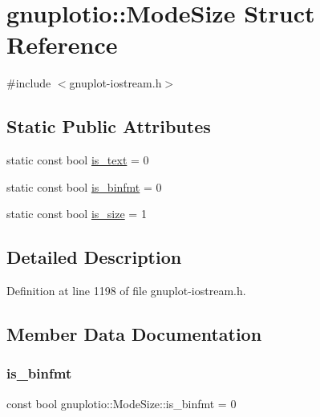 \hypertarget{structgnuplotio_1_1_mode_size}{}\section{gnuplotio\+:\+:Mode\+Size Struct Reference}
\label{structgnuplotio_1_1_mode_size}


{\ttfamily \#include $<$gnuplot-\/iostream.\+h$>$}

\subsection*{Static Public Attributes}
\begin{DoxyCompactItemize}
\item 
static const bool \hyperlink{structgnuplotio_1_1_mode_size_aa01840f76877ae7c8bad254dae28e32c}{is\+\_\+text} = 0
\item 
static const bool \hyperlink{structgnuplotio_1_1_mode_size_ac5243e8e4910f2f6a2724b9fc0de4ff9}{is\+\_\+binfmt} = 0
\item 
static const bool \hyperlink{structgnuplotio_1_1_mode_size_aa20ae9f1ce222504489db33d13eb46c0}{is\+\_\+size} = 1
\end{DoxyCompactItemize}


\subsection{Detailed Description}


Definition at line 1198 of file gnuplot-\/iostream.\+h.



\subsection{Member Data Documentation}
\mbox{\label{structgnuplotio_1_1_mode_size_ac5243e8e4910f2f6a2724b9fc0de4ff9}} 
\subsubsection{\texorpdfstring{is\+\_\+binfmt}{is\_binfmt}}
{\footnotesize\ttfamily const bool gnuplotio\+::\+Mode\+Size\+::is\+\_\+binfmt = 0\hspace{0.3cm}{\ttfamily [static]}}



